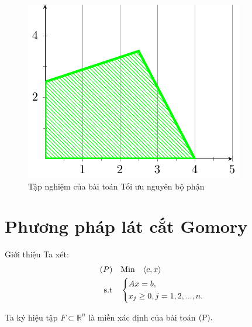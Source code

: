 \documentclass[10pt]{beamer}
\begin{document}
\begin{frame}
\begin{figure}[h]
    \centering
    \includegraphics[width=0.7\linewidth]{nguyenbophan.pdf}
    \caption{Tập nghiệm của bài toán Tối ưu nguyên bộ phận}
\end{figure}
\end{frame}
    






































\section{Phương pháp lát cắt Gomory}

\begin{frame}{Giới thiệu}
\vspace{-40pt}
Ta xét:\\
    \begin{equation}
     \begin{split}
         {(P)} & \quad {\rm Min}  \quad\langle c,x \rangle\\
          \rm{s.t} &\quad \left\{\begin{split}
            & Ax= b,\\
           & x_j \ge 0, j=1,2,...,n.\\
           \end{split}\right.
       \end{split}
   \end{equation}

  Ta ký hiệu tập $ F \subset \mathbb R^n$ là miền xác định của bài toán ${\rm (P)}.$
\end{frame}
\end{document}
